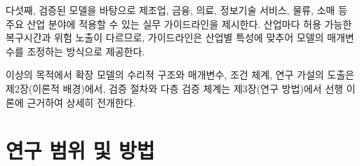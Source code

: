 {다섯째, 검증된 모델을 바탕으로 제조업, 금융, 의료, 정보기술 서비스, 물류,
소매 등 주요 산업 분야에 적용할 수 있는 실무 가이드라인을 제시한다. 산업마다
허용 가능한 복구시간과 위험 노출이 다르므로, 가이드라인은 산업별 특성에 맞추어
모델의 매개변수를 조정하는 방식으로 제공한다.


이상의 목적에서 확장 모델의 수리적 구조와 매개변수, 조건 체계, 연구 가설의
도출은 제2장(이론적 배경)에서, 검증 절차와 다층 검증 체계는
제3장(연구 방법)에서 선행 이론에 근거하여 상세히 전개한다.}


\section{연구 범위 및 방법}
\label{sec:research_scope}

